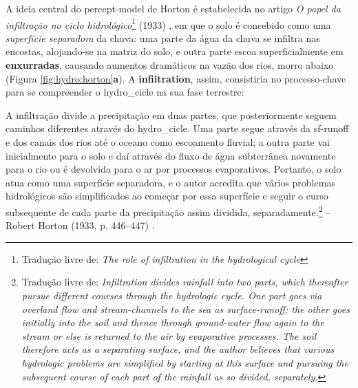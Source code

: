 \documentclass[./main.tex]{subfiles}
\begin{document}
\par A ideia central do \gls{percept-model} de Horton é estabelecida no artigo \textit{O papel da infiltração no ciclo hidrológico}\footnote{Tradução livre de: \textit{The role of infiltration in the hydrological cycle}} (1933) \cite{Horton1933}, em que o solo é concebido como uma \textit{superfície separadora} da chuva: uma parte da água da chuva se infiltra nas encostas, alojando-se na matriz do solo, e outra parte escoa superficialmente em \textbf{enxurradas}, causando aumentos dramáticos na vazão dos rios, morro abaixo (Figura \ref{fig:hydro:horton}\textbf{a}). A \textbf{\gls{infiltration}}, assim, consistiria no processo-chave para se compreender o \gls{hydro_cicle} na sua fase terrestre:

\begin{adjustwidth}{100pt}{0pt}
\medskip
\small A infiltração divide a precipitação em duas partes, que posteriormente seguem caminhos diferentes através do \gls{hydro_cicle}. Uma parte segue através da \gls{sf-runoff} e dos canais dos rios até o oceano como escoamento fluvial; a outra parte vai inicialmente para o solo e daí através do fluxo de água subterrânea novamente para o rio ou é devolvida para o ar por processos evaporativos. Portanto, o solo atua como uma superfície separadora, e o autor acredita que vários problemas hidrológicos são simplificados ao começar por essa superfície e seguir o curso subsequente de cada parte da precipitação assim dividida, separadamente.\footnote{Tradução livre de: \textit{Infiltration divides rainfall into two parts, which thereafter pursue different courses through the hydrologic cycle. One part goes via overland flow and stream-channels to the sea as surface-runoff; the other goes initially into the soil and thence through ground-water flow again to the stream or else is returned to the air by evaporative processes. The soil therefore acts as a separating surface, and the author believes that various hydrologic problems are simplified by starting at this surface and pursuing the subsequent course of each part of the rainfall as so divided, separately.}} -- Robert Horton (1933, p. 446–447) \cite{Horton1933}. 
\medskip
\end{adjustwidth}
\end{document}
